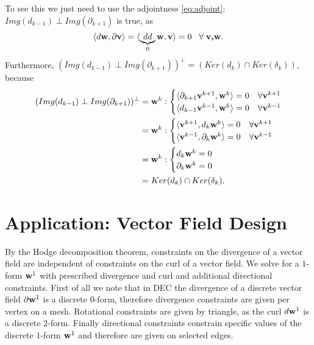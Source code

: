 To see this we just need to use the adjointness \ref{eq:adjoint}: $Img(d_{k-1}) \perp Img (\partial_{k+1})$ is true, as
\[\langle d \textbf{w} , \partial \textbf{v}\rangle = \langle \underbrace{dd}_{0} \textbf{w} , \textbf{v} \rangle = 0 \;\;\; \forall\; \textbf{v,w}.\]
Furthermore, $(Img(d_{k-1}) \perp Img (\partial_{k+1}))^\perp = \left(Ker(d_k) \cap Ker(\delta_k)\right)$, because
\begin{align*}
(Img(d_{k-1}) \perp Img (\partial_{k+1}))^\perp &= \textbf{w}^k: \begin{cases} \langle \partial_{k+1}\textbf{v}^{k+1},\textbf{w}^k \rangle = 0 & \forall \textbf{v}^{k+1}\\
\langle d_{k-1}\textbf{v}^{k-1},\textbf{w}^k \rangle = 0 & \forall \textbf{v}^{k-1}\end{cases} \\
&= \textbf{w}^k: \begin{cases} \langle \textbf{v}^{k+1},d_{k}\textbf{w}^k \rangle = 0 & \forall \textbf{v}^{k+1}\\
\langle \textbf{v}^{k-1},\partial_{k}\textbf{w}^k \rangle = 0 & \forall \textbf{v}^{k-1}\end{cases} \\
&= \textbf{w}^k: \begin{cases} d_{k}\textbf{w}^k = 0 \\
\partial_{k}\textbf{w}^k  = 0 \end{cases}\\
&= Ker(d_k) \cap Ker(\delta_k).
\end{align*}





\section{Application: Vector Field Design}
By the Hodge decomposition theorem, constraints on the divergence of a vector field are independent of constraints on the curl of a vector field. We solve for a $1$-form $\textbf{w}^1$ with prescribed divergence and curl and additional directional constraints.
First of all we note that in DEC the divergence of a discrete vector field $\partial \textbf{w}^1$ is a discrete $0$-form, therefore divergence constraints are given per vertex on a mesh. Rotational constraints are given by triangle, as the curl $d\textbf{w}^1$ is a discrete $2$-form. Finally directional constraints constrain specific values of the discrete $1$-form $\textbf{w}^1$ and therefore are given on selected edges.

